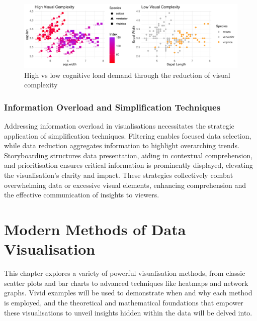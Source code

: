 \documentclass{article}\usepackage[]{graphicx}\usepackage[]{xcolor}
\makeatletter
\def\maxwidth{ %
  \ifdim\Gin@nat@width>\linewidth
    \linewidth
  \else
    \Gin@nat@width
  \fi
}
\newenvironment{knitrout}{}{} %
\makeatother
\begin{document}
\begin{knitrout}\scriptsize
{}\color{fgcolor}\begin{figure}[H]

{\centering \includegraphics[width=\maxwidth]{figure/beamer-cogload-plot-1} 

}

\caption[High vs low cognitive load demand through the reduction of visual complexity]{High vs low cognitive load demand through the reduction of visual complexity}\label{fig:cogload-plot}
\end{figure}

\end{knitrout}

\subsubsection{Information Overload and Simplification Techniques}
Addressing information overload in visualisations necessitates the strategic application of simplification techniques. Filtering enables focused data selection, while data reduction aggregates information to highlight overarching trends. Storyboarding structures data presentation, aiding in contextual comprehension, and prioritisation ensures critical information is prominently displayed, elevating the visualisation's clarity and impact. These strategies collectively combat overwhelming data or excessive visual elements, enhancing comprehension and the effective communication of insights to viewers.

\newpage

\section{Modern Methods of Data Visualisation}

This chapter explores a variety of powerful visualisation methods, from classic scatter plots and bar charts to advanced techniques like heatmaps and network graphs. Vivid examples will be used to demonstrate when and why each method is employed, and the theoretical and mathematical foundations that empower these visualisations to unveil insights hidden within the data will be delved into.
\end{document}
